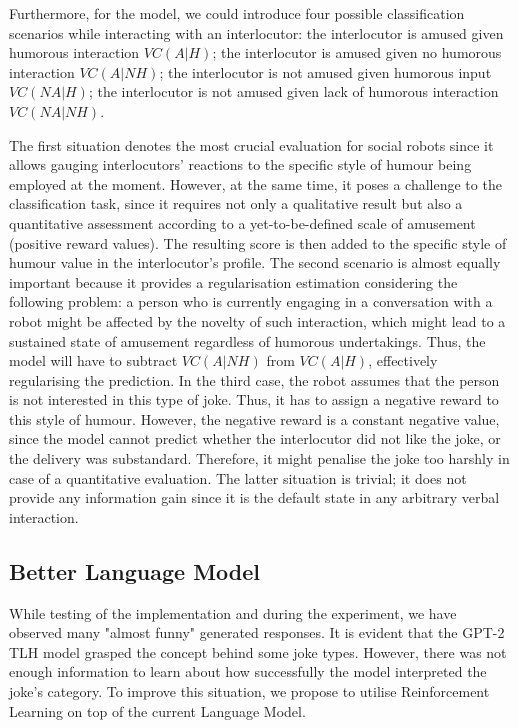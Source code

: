 Furthermore, for the model, we could introduce four possible classification scenarios while interacting with an interlocutor: the interlocutor is amused given humorous interaction \(VC(A|H)\); the interlocutor is amused given no humorous interaction \(VC(A|NH)\); the interlocutor is not amused given humorous input \(VC(NA|H)\); the interlocutor is not amused given lack of humorous interaction \(VC(NA|NH)\). 

The first situation denotes the most crucial evaluation for social robots since it allows gauging interlocutors’ reactions to the specific style of humour being employed at the moment. However, at the same time, it poses a challenge to the classification task, since it requires not only a qualitative result but also a quantitative assessment according to a yet-to-be-defined scale of amusement (positive reward values). The resulting score is then added to the specific style of humour value in the interlocutor’s profile. The second scenario is almost equally important because it provides a regularisation estimation considering the following problem: a person who is currently engaging in a conversation with a robot might be affected by the novelty of such interaction, which might lead to a sustained state of amusement regardless of humorous undertakings. Thus, the model will have to subtract \(VC(A|NH)\) from \(VC(A|H)\), effectively regularising the prediction. In the third case, the robot assumes that the person is not interested in this type of joke. Thus, it has to assign a negative reward to this style of humour. However, the negative reward is a constant negative value, since the model cannot predict whether the interlocutor did not like the joke, or the delivery was substandard. Therefore, it might penalise the joke too harshly in case of a quantitative evaluation. The latter situation is trivial; it does not provide any information gain since it is the default state in any arbitrary verbal interaction.


\subsection{Better Language Model}

While testing of the implementation and during the experiment, we have observed many "almost funny" generated responses. It is evident that the GPT-2 TLH model grasped the concept behind some joke types. However, there was not enough information to learn about how successfully the model interpreted the joke's category. To improve this situation, we propose to utilise Reinforcement Learning on top of the current Language Model.

